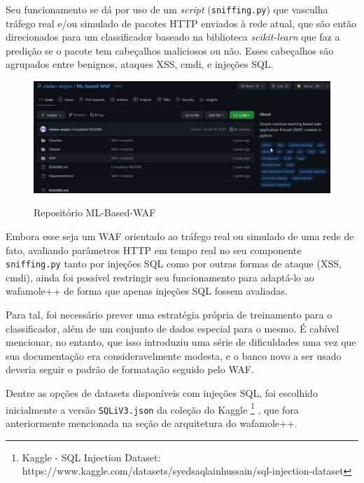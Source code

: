Seu funcionamento se dá por uso de um \textit{script} (\verb+sniffing.py+) que vasculha tráfego real e/ou simulado de pacotes HTTP enviados à rede atual, que são então direcionados para um classificador baseado na biblioteca \textit{scikit-learn} que faz a predição se o pacote tem cabeçalhos maliciosos ou não. Esses cabeçalhos são agrupados entre benignos, ataques XSS, cmdi, e injeções SQL.

\begin{figure}[ht]
    \centering
    \caption{Repositório ML-Based-WAF}
    \includegraphics[width=16cm]{figuras/MLBasedWAF.png} 
    \label{fig:internet} 
\end{figure}

Embora esse seja um WAF orientado ao tráfego real ou simulado de uma rede de fato, avaliando parâmetros HTTP em tempo real no seu componente \verb+sniffing.py+ tanto por injeções SQL como por outras formas de ataque (XSS, cmdi), ainda foi possível restringir seu funcionamento para adaptá-lo ao wafamole++ de forma que apenas injeções SQL fossem avaliadas.

Para tal, foi necessário prever uma estratégia própria de treinamento para o classificador, além de um conjunto de dados especial para o mesmo. É cabível mencionar, no entanto, que isso introduziu uma série de dificuldades uma vez que sua documentação era consideravelmente modesta, e o banco novo a ser usado deveria seguir o padrão de formatação seguido pelo WAF.

Dentre as opções de datasets disponíveis com injeções SQL, foi escolhido inicialmente a versão \verb+SQLiV3.json+ da coleção do Kaggle \footnote{Kaggle - SQL Injection Dataset: https://www.kaggle.com/datasets/syedsaqlainhussain/sql-injection-dataset} \cite{kaggle_dataset_sql}, que fora anteriormente mencionada na seção de arquitetura do wafamole++.

